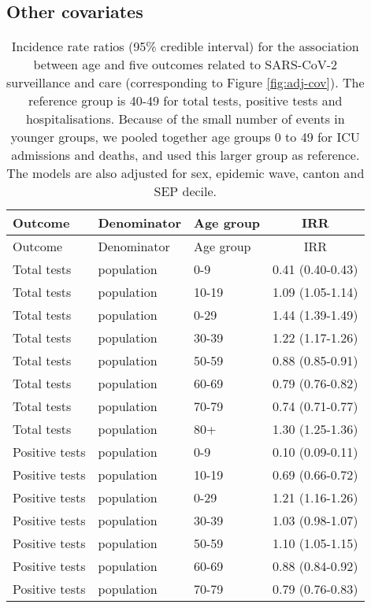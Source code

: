 \documentclass{article}
\begin{document}
	\subsection{Other covariates}
	
	\begin{longtable}{lllc}
		\caption{Incidence rate ratios (95\% credible interval) for the association between age and five outcomes related to SARS-CoV-2 surveillance and care (corresponding to Figure \ref{fig:adj-cov}). The reference group is 40-49 for total tests, positive tests and hospitalisations. Because of the small number of events in younger groups, we pooled together age groups 0 to 49 for ICU admissions and deaths, and used this larger group as reference. The models are also adjusted for sex, epidemic wave, canton and SEP decile.}
		\label{tab:cov-age} \\
		\hline
		Outcome & Denominator & Age group & IRR \\ 
		\hline
		\endfirsthead
			\hline
			Outcome & Denominator & Age group & IRR \\ 
			\hline
			\endhead
			Total tests & population & 0-9 & 0.41 (0.40-0.43) \\ 
			Total tests & population & 10-19 & 1.09 (1.05-1.14) \\ 
			Total tests & population & 0-29 & 1.44 (1.39-1.49) \\ 
			Total tests & population & 30-39 & 1.22 (1.17-1.26) \\ 
			Total tests & population & 50-59 & 0.88 (0.85-0.91) \\ 
			Total tests & population & 60-69 & 0.79 (0.76-0.82) \\ 
			Total tests & population & 70-79 & 0.74 (0.71-0.77) \\ 
			Total tests & population & 80+ & 1.30 (1.25-1.36) \\ 
			Positive tests & population & 0-9 & 0.10 (0.09-0.11) \\ 
			Positive tests & population & 10-19 & 0.69 (0.66-0.72) \\ 
			Positive tests & population & 0-29 & 1.21 (1.16-1.26) \\ 
			Positive tests & population & 30-39 & 1.03 (0.98-1.07) \\ 
			Positive tests & population & 50-59 & 1.10 (1.05-1.15) \\ 
			Positive tests & population & 60-69 & 0.88 (0.84-0.92) \\ 
			Positive tests & population & 70-79 & 0.79 (0.76-0.83) \\ 

\end{longtable}
\end{document}
